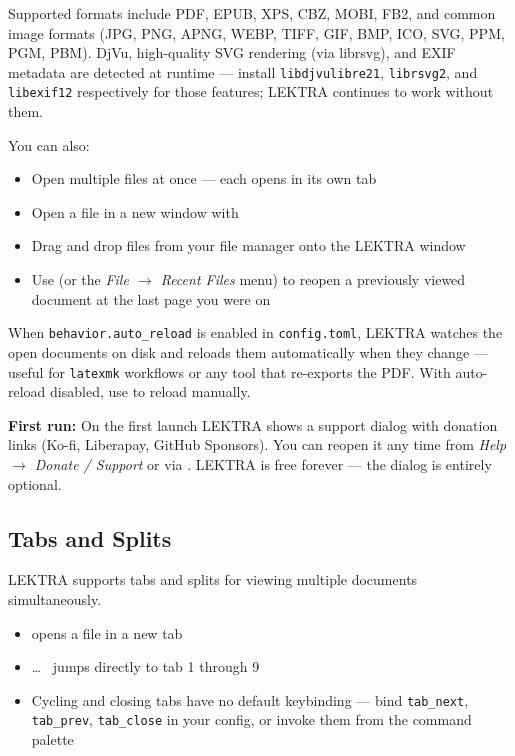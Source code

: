\documentclass[a4paper,12pt]{article}
\begin{document}
Supported formats include PDF, EPUB, XPS, CBZ, MOBI, FB2, and common image formats (JPG, PNG, APNG, WEBP, TIFF, GIF, BMP, ICO, SVG, PPM, PGM, PBM). DjVu, high-quality SVG rendering (via librsvg), and EXIF metadata are detected at runtime — install \texttt{libdjvulibre21}, \texttt{librsvg2}, and \texttt{libexif12} respectively for those features; LEKTRA continues to work without them.

You can also:
\begin{itemize}[leftmargin=*]
    \item Open multiple files at once — each opens in its own tab
    \item Open a file in a new window with 
    \item Drag and drop files from your file manager onto the LEKTRA window
    \item Use  (or the \textit{File $\to$ Recent Files} menu) to reopen a previously viewed document at the last page you were on
\end{itemize}

When \texttt{behavior.auto\_reload} is enabled in \texttt{config.toml}, LEKTRA watches the open documents on disk and reloads them automatically when they change — useful for \texttt{latexmk} workflows or any tool that re-exports the PDF. With auto-reload disabled, use  to reload manually.

\begin{ghnote}
    \textbf{First run:} On the first launch LEKTRA shows a support dialog with donation links (Ko-fi, Liberapay, GitHub Sponsors). You can reopen it any time from \textit{Help $\to$ Donate / Support} or via . LEKTRA is free forever — the dialog is entirely optional.
\end{ghnote}

\subsection{Tabs and Splits}

LEKTRA supports tabs and splits for viewing multiple documents simultaneously.

\begin{itemize}[leftmargin=*]
    \item {} opens a file in a new tab
    \item {} \ldots\  jumps directly to tab 1 through 9
    \item Cycling and closing tabs have no default keybinding — bind \texttt{tab\_next}, \texttt{tab\_prev}, \texttt{tab\_close} in your config, or invoke them from the \keys{:} command palette
\end{itemize}
\end{document}
